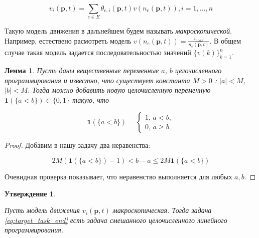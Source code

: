 \documentclass[12pt, a4paper]{article}
\newtheorem{state}{Утверждение}[section]
\newtheorem{lemma}{Лемма}[section]
\begin{document}
\begin{equation}
	\label{eq:velocity_eq_macro}
	 v_i(\textbf{p}, t) = \sum \limits _{e \in E} \theta_{e, i} (\textbf{p}, t) v (n_e (\textbf{p}, t)),  i = 1, \dots, n
\end{equation}

Такую модель движения в дальнейшем будем называть \textit{макроскопической}.
Например, естествено расмотреть модель $ v (n_e (\textbf{p}, t)) = \frac{v_{max}}{n_e (\textbf{p}, t)}$. В общем случае такая модель задается последовательностью значений  $\{v(k)\}_{k = 1}^n$.

\begin{lemma}
	\label{lemma:lt}
	Пусть даны вещественные переменные $a$, $b$ целочисленного программирования и известно, что существует константа $M > 0$ : $|a| < M$, $|b| < M$. Тогда можно добавить новую целочисленную переменную $\textbf{1} (\{a < b\}) \in \{0, 1\}$ такую, что
	
	\begin{equation*}
		\textbf{1} (\{a < b\}) = 
		\begin{cases}
			1,\, a < b,
			\\
			0,\, a \ge b.
		\end{cases}
	\end{equation*}

\end{lemma}

\begin{proof}
	Добавим в нашу задачу два неравенства:
	
	$$ 2M (\textbf{1} (\{a < b\}) - 1) < b - a \le 2M\textbf{1} (\{a < b\}) $$
	
	Очевидная проверка показывает, что неравенство выполняется для любых $a, b$.
	
	
\end{proof}

\begin{state}
	
	\label{state:lin_prog}
	
	Пусть модель движения $ v_i(\textbf{p}, t)$ макроскопическая. Тогда задача \eqref{eq:target_task_end} есть задача смешанного целочисленного линейного программирования.
\end{state}
\end{document}
